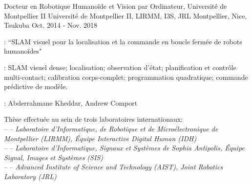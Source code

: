 

\begin{cventries}

  \cventry
    {Docteur en Robotique Humanoïde et Vision par Ordinateur, Université de Montpellier II} %
    {Université de Montpellier II, LIRMM, I3S, JRL} %
    {Montpellier, Nice, Tsukuba} %
    {Oct. 2014 - Nov. 2018} %
    {
      \begin{cvitems} %
        \item {} : ``SLAM visuel pour la localisation et la commande en boucle fermée de robots humanoïdes"
        \item {}: SLAM visuel dense; localisation; observation d'état; planification et contrôle multi-contact; calibration corps-complet; programmation quadratique; commande prédictive de modèle.
        \item {}: Abderrahmane Kheddar, Andrew Comport 
        \item Thèse effectuée au sein de trois laboratoires internationaux:\\
        --  -- \emph{Laboratoire d'Informatique, de Robotique et de Microélectronique de Montpellier (LIRMM), Équipe Interactive Digital Human (IDH)}\\
          --  -- \emph{Laboratoire d'Informatique, Signaux et Systèmes de Sophia Antipolis, Équipe Signal, Images et Systèmes (SIS)}\\
          --  -- \emph{Advanced Institute of Science and Technology (AIST), Joint Robotics Laboratory (JRL)}
      \end{cvitems}
    }


\end{cventries}

